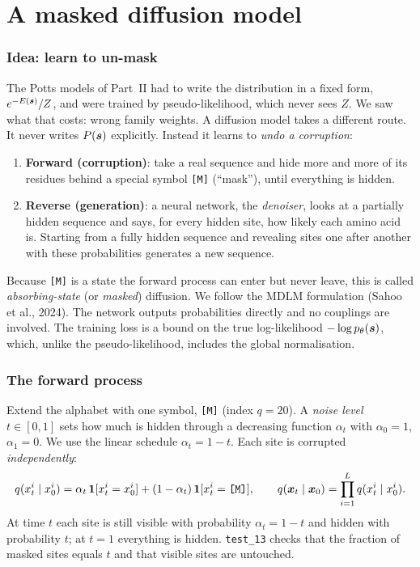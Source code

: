 \part{A masked diffusion model}

\section{Idea: learn to un-mask}\label{sec:md_idea}
The Potts models of Part~II had to write the distribution in a fixed form, $e^{-E(\bm{s})}/Z$, and were trained by
pseudo-likelihood, which never sees $Z$. We saw what that costs: wrong family weights. A diffusion model takes a
different route. It never writes $P(\bm{s})$ explicitly. Instead it learns to \emph{undo a corruption}:
\begin{enumerate}[nosep]
\item \textbf{Forward (corruption)}: take a real sequence and hide more and more of its residues behind a special
      symbol \texttt{[M]} (``mask''), until everything is hidden.
\item \textbf{Reverse (generation)}: a neural network, the \emph{denoiser}, looks at a partially hidden sequence and
      says, for every hidden site, how likely each amino acid is. Starting from a fully hidden sequence and revealing
      sites one after another with these probabilities generates a new sequence.
\end{enumerate}
Because \texttt{[M]} is a state the forward process can enter but never leave, this is called
\emph{absorbing-state} (or \emph{masked}) diffusion. We follow the MDLM formulation (Sahoo et al., 2024). The network
outputs probabilities directly and no couplings are involved. The training loss is a bound on the true
log-likelihood $-\log p_\theta(\bm{s})$, which, unlike the pseudo-likelihood, includes the global normalisation.

\section{The forward process}\label{sec:md_forward}
Extend the alphabet with one symbol, \texttt{[M]} (index $q=20$). A \emph{noise level} $t\in[0,1]$ sets how much is
hidden through a decreasing function $\alpha_t$ with $\alpha_0=1$, $\alpha_1=0$. We use the linear schedule
$\alpha_t=1-t$. Each site is corrupted \emph{independently}:
\begin{equation}\label{eq:md_forward}
q(x^i_t\mid x^i_0)=\alpha_t\,\mathbf{1}[x^i_t=x^i_0]+(1-\alpha_t)\,\mathbf{1}[x^i_t=\texttt{[M]}],\qquad
q(\bm x_t\mid\bm x_0)=\prod_{i=1}^Lq(x^i_t\mid x^i_0).
\end{equation}
At time $t$ each site is still visible with probability $\alpha_t=1-t$ and hidden with probability $t$; at $t=1$
everything is hidden. \texttt{test\_13} checks that the fraction of masked sites equals $t$ and that visible sites are untouched.

